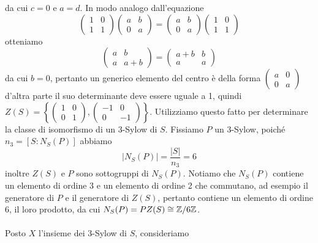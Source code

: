 \documentclass[11pt]{scrartcl}
\begin{document}
da cui $c = 0$ e $a = d$. In modo analogo dall'equazione
\[
    \begin{pmatrix}
        1 & 0\\
        1 & 1
    \end{pmatrix}
    \begin{pmatrix}
        a & b\\
        0 & a
    \end{pmatrix} = 
    \begin{pmatrix}
        a & b\\
        0 & a
    \end{pmatrix}
    \begin{pmatrix}
        1 & 0\\
        1 & 1
    \end{pmatrix}
\]
otteniamo 
\[
    \begin{pmatrix}
        a & b\\
        a & a + b
    \end{pmatrix} = 
    \begin{pmatrix}
        a + b & b\\
        a & a
    \end{pmatrix}
\]
da cui $b = 0$, pertanto un generico elemento del centro è della forma
$
    \begin{pmatrix}
        a & 0\\
        0 & a
    \end{pmatrix}
$
d'altra parte il suo determinante deve essere uguale a 1, quindi $Z(S) = 
\left\{\begin{pmatrix}
    1 & 0\\
    0 & 1
\end{pmatrix}, \begin{pmatrix}
    -1 & 0\\
    0 & -1
\end{pmatrix}\right\}$. Utilizziamo questo fatto per determinare la classe
di isomorfismo di un 3-Sylow di $S$. \newline 
Fissiamo $P$ un 3-Sylow, poiché $n_3 = [S: N_S(P)]$ abbiamo 
\[
    |N_S(P)| = \frac{|S|}{n_3} = 6
\]
inoltre $Z(S)$ e $P$ sono sottogruppi di $N_S(P)$. Notiamo che $N_S(P)$
contiene un elemento di ordine 3 e un elemento di ordine 2 che commutano, 
ad esempio il generatore di $P$ e il generatore di $Z(S)$,
pertanto contiene un elemento di ordine 6, il loro prodotto, da cui 
$N_S(P) = PZ(S) \cong \mathbb{Z}/{6}\mathbb{Z}$.
\\\\
Posto $X$ l'insieme dei 3-Sylow di $S$, consideriamo
\end{document}
